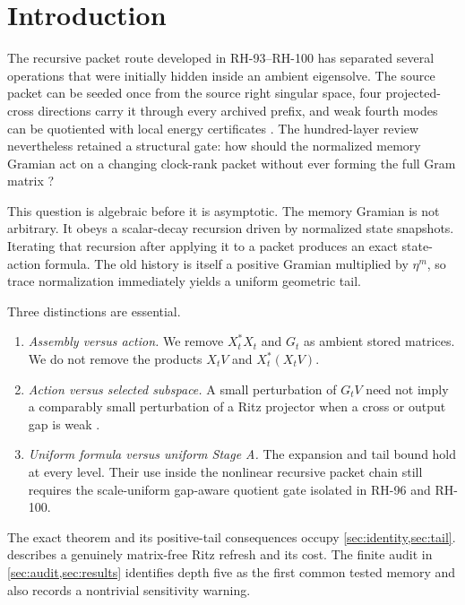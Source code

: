 \documentclass[11pt]{article}
\theoremstyle{definition}
\theoremstyle{remark}
\begin{document}
\section{Introduction}

The recursive packet route developed in RH-93--RH-100 has separated several
operations that were initially hidden inside an ambient eigensolve.  The
source packet can be seeded once from the source right singular space, four
projected-cross directions carry it through every archived prefix, and weak
fourth modes can be quotiented with local energy certificates
\citep{WangSourceSeeded2026,WangReducedCross2026,WangWeakMode2026}.  The
hundred-layer review nevertheless retained a structural gate: how should the
normalized memory Gramian act on a changing clock-rank packet without ever
forming the full Gram matrix \citep{WangHundredLayer2026}?

This question is algebraic before it is asymptotic.  The memory Gramian is
not arbitrary.  It obeys a scalar-decay recursion driven by normalized state
snapshots.  Iterating that recursion after applying it to a packet produces
an exact state-action formula.  The old history is itself a positive Gramian
multiplied by $\eta^m$, so trace normalization immediately yields a uniform
geometric tail.

Three distinctions are essential.
\begin{enumerate}[leftmargin=2em]
\item \emph{Assembly versus action.}  We remove $X_t^*X_t$ and $G_t$ as
ambient stored matrices.  We do not remove the products $X_tV$ and
$X_t^*(X_tV)$.
\item \emph{Action versus selected subspace.}  A small perturbation of
$G_tV$ need not imply a comparably small perturbation of a Ritz projector
when a cross or output gap is weak \citep{Kato1995,StewartSun1990}.
\item \emph{Uniform formula versus uniform Stage A.}  The expansion and tail
bound hold at every level.  Their use inside the nonlinear recursive packet
chain still requires the scale-uniform gap-aware quotient gate isolated in
RH-96 and RH-100.
\end{enumerate}

The exact theorem and its positive-tail consequences occupy
\cref{sec:identity,sec:tail}.   describes a genuinely
matrix-free Ritz refresh and its cost.  The finite audit in
\cref{sec:audit,sec:results} identifies depth five as the first common tested
memory and also records a nontrivial sensitivity warning.
\end{document}

